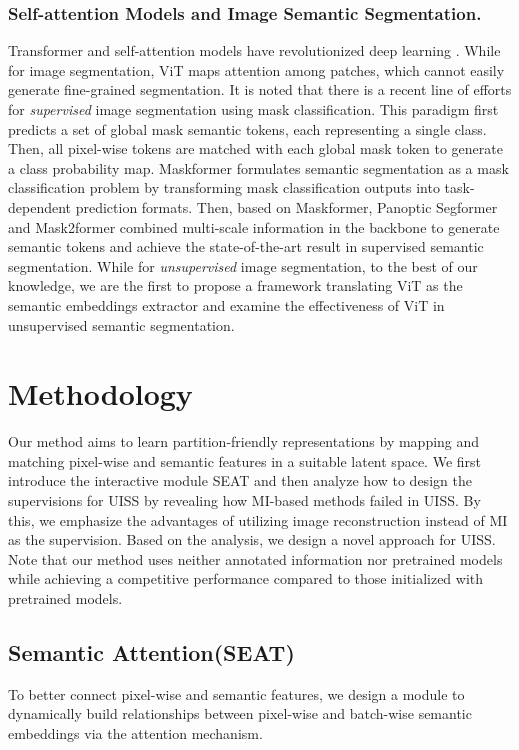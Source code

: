 \documentclass[letterpaper]{article} \usepackage{aaai23}  \usepackage{times}  \usepackage{helvet}  \usepackage{courier}  \usepackage[hyphens]{url}  \usepackage{graphicx} \urlstyle{rm} \def\UrlFont{\rm}  \usepackage{natbib}  \usepackage{caption} \frenchspacing  \setlength{\pdfpagewidth}{8.5in}  \setlength{\pdfpageheight}{11in}  \usepackage{algorithm}
\begin{document}
\subsubsection{Self-attention Models and Image Semantic Segmentation.}
Transformer and self-attention models \cite{zeng2022simple, zeng2023substructure} have revolutionized deep learning \cite{wang2022mvsnet, wang2023flora}. While for image segmentation, ViT maps attention among patches, which cannot easily generate fine-grained segmentation. 
It is noted that there is a recent line of efforts for \textit{supervised} image segmentation using mask classification\cite{he2017mask}\cite{carion2020end}. This paradigm first predicts a set of global mask semantic tokens, each representing a single class. Then, all pixel-wise tokens are matched with each global mask token to generate a class probability map. Maskformer\cite{cheng2021per} formulates semantic segmentation as a mask classification problem by transforming mask classification outputs into task-dependent prediction formats. Then, based on Maskformer, Panoptic Segformer\cite{li2021panoptic} and Mask2former\cite{cheng2021masked} combined multi-scale information in the backbone to generate semantic tokens and achieve the state-of-the-art result in supervised semantic segmentation. While for \textit{unsupervised} image segmentation, to the best of our knowledge, we are the first to propose a framework translating ViT as the semantic embeddings extractor and examine the effectiveness of ViT in unsupervised semantic segmentation.

\section{Methodology}
Our method aims to learn partition-friendly representations by mapping and matching pixel-wise and semantic features in a suitable latent space. We first introduce the interactive module SEAT and then analyze how to design the supervisions for UISS by revealing how MI-based methods failed in UISS. By this, we emphasize the advantages of utilizing image reconstruction instead of MI as the supervision. Based on the analysis, we design a novel approach for UISS.
Note that our method uses neither annotated information nor pretrained models while achieving a competitive performance compared to those initialized with pretrained models. 

\subsection{Semantic Attention(SEAT)}
To better connect pixel-wise and semantic features, we design a module to dynamically build relationships between pixel-wise and batch-wise semantic embeddings via the attention mechanism.
\end{document}

